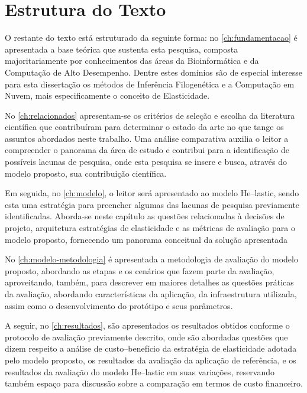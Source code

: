 \documentclass[english,brazilian]{UNISINOSmonografia} %
\begin{document}

\section{Estrutura do Texto}


O restante do texto está estruturado da seguinte forma: no \autoref{ch:fundamentacao} é apresentada a base teórica que sustenta esta pesquisa, composta majoritariamente por conhecimentos das áreas da Bioinformática e da Computação de Alto Desempenho. 
Dentre estes domínios são de especial interesse para esta dissertação os métodos de Inferência Filogenética e a Computação em Nuvem, mais especificamente o conceito de Elasticidade.

No \autoref{ch:relacionados} apresentam-se os critérios de seleção e escolha da literatura científica que contribuíram para determinar o estado da arte no que tange os assuntos abordados neste trabalho.
Uma análise comparativa auxilia o leitor a compreender o panorama da área de estudo e contribui para a identificação de possíveis lacunas de pesquisa, onde esta pesquisa se insere e busca, através do modelo proposto, sua contribuição científica.


Em seguida, no \autoref{ch:modelo}, o leitor será apresentado ao modelo \textsf{He}--lastic, sendo esta uma estratégia para preencher algumas das lacunas de pesquisa previamente identificadas. Aborda-se neste capítulo as questões relacionadas à decisões de projeto, arquitetura estratégias de elasticidade e as métricas de avaliação para o modelo proposto, fornecendo um panorama conceitual da solução apresentada


No \autoref{ch:modelo-metodologia} é apresentada a metodologia de avaliação do modelo proposto, abordando as etapas e os cenários que fazem parte da avaliação, aproveitando, também, para descrever em maiores detalhes as questões práticas da avaliação, abordando características da aplicação, da infraestrutura utilizada, assim como o desenvolvimento do protótipo e seus parâmetros.


A seguir, no \autoref{ch:resultados}, são apresentados os resultados obtidos conforme o protocolo de avaliação previamente descrito, onde são abordadas questões que dizem respeito a análise de custo--benefício da estratégia de elasticidade adotada pelo modelo proposto, os resultados da avaliação da aplicação de referência, e os resultados da avaliação do modelo \textsf{He}--lastic em suas variações, reservando também espaço para discussão sobre a comparação em termos de custo financeiro.
\end{document}
